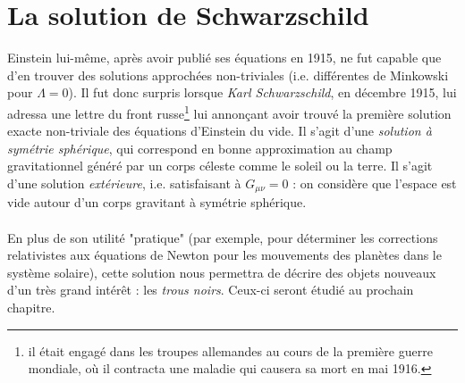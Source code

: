 \chapter{La solution de Schwarzschild}

Einstein lui-même, après avoir publié ses équations en 1915, ne fut capable que d'en trouver des solutions approchées non-triviales (i.e. différentes de Minkowski pour $\Lambda = 0$). Il fut donc surpris lorsque \emph{Karl Schwarzschild}, en décembre 1915, lui adressa une lettre du front russe\footnote{il était engagé dans les troupes allemandes au cours de la première guerre mondiale, où il contracta une maladie qui causera sa mort en mai 1916.} lui annonçant avoir trouvé la première solution exacte non-triviale des équations d'Einstein du vide. Il s'agit d'une \emph{solution à symétrie sphérique}, qui correspond en bonne approximation au champ gravitationnel généré par un corps céleste comme le soleil ou la terre. Il s'agit d'une solution \emph{extérieure}, i.e. satisfaisant à $G_{\mu\nu} = 0$ : on considère que l'espace est vide autour d'un corps gravitant à symétrie sphérique.\\
\\
En plus de son utilité "pratique" (par exemple, pour déterminer les corrections relativistes aux équations de Newton pour les mouvements des planètes dans le système solaire), cette solution nous permettra de décrire des objets nouveaux d'un très grand intérêt : les \emph{trous noirs}. Ceux-ci seront étudié au prochain chapitre.

